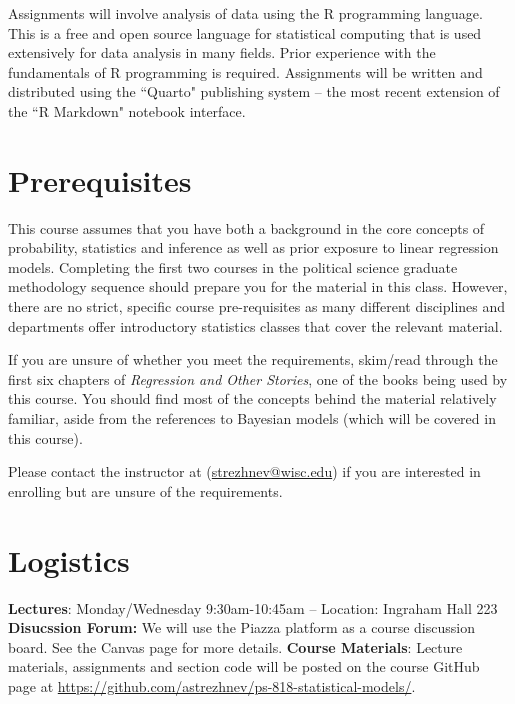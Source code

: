 \documentclass[11pt, article, oneside]{memoir}
\theoremstyle{Assumption}
\begin{document}
Assignments will involve analysis of data using the R programming language. This is a free and open source language for statistical computing that is used extensively for data analysis in many fields. Prior experience with the fundamentals of R programming is required. Assignments will be written and distributed using the ``Quarto" publishing system -- the most recent extension of the ``R Markdown" notebook interface. 

\section*{Prerequisites}

This course assumes that you have both a background in the core concepts of probability, statistics and inference as well as prior exposure to linear regression models. Completing the first two courses in the political science graduate methodology sequence should prepare you for the material in this class. However, there are no strict, specific course pre-requisites as many different disciplines and departments offer introductory statistics classes that cover the relevant material.

If you are unsure of whether you meet the requirements, skim/read through the first six chapters of \textit{Regression and Other Stories}, one of the books being used by this course. You should find most of the concepts behind the material relatively familiar, aside from the references to Bayesian models (which will be covered in this course).

Please contact the instructor at (\href{mailto:strezhnev@wisc.edu}{strezhnev@wisc.edu}) if you are interested in enrolling but are unsure of the requirements. 

\section*{Logistics}

\textbf{Lectures}: Monday/Wednesday  9:30am-10:45am -- Location: Ingraham Hall 223
\newline\newline \textbf{Disucssion Forum:} We will use the Piazza platform as a course discussion board. See the Canvas page for more details.
\newline\newline\textbf{Course Materials}: Lecture materials, assignments and section code will be posted on the course GitHub page at \url{https://github.com/astrezhnev/ps-818-statistical-models/}.
\end{document}
